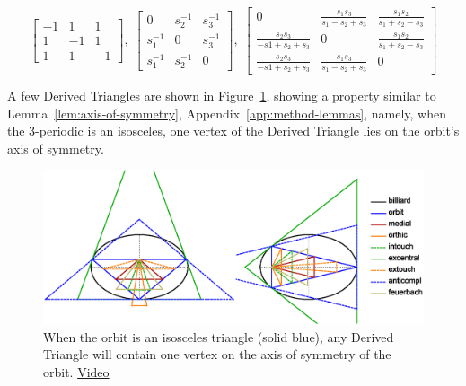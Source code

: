 

\begin{equation*}
\left[
\begin{matrix}
-1&1&1\\1&-1&1\\1&1&-1
\end{matrix}
\right],\;
\left[
\begin{matrix}
0&s_2^{-1}&s_3^{-1}\\s_1^{-1}&0&s_3^{-1}\\s_1^{-1}&s_2^{-1}&0
\end{matrix}
\right],\;
\left[
\begin{matrix}
0&\frac{s_1 s_3}{s_1-s_2+s_3}&\frac{s_1 s_2}{s_1+s_2-s_3}\\
\frac{s_2 s_3}{-s1+s_2+s_3}&0&\frac{s_1 s_2}{s_1+s_2-s_3}\\
\frac{s_2 s_3}{-s1+s_2+s_3}&\frac{s_1 s_3}{s_1-s_2+s_3}&0
\end{matrix}
\right]
\end{equation*}

A few Derived Triangles are shown in Figure~\ref{fig:derived-isosceles}, showing a property similar to Lemma~\ref{lem:axis-of-symmetry}, Appendix~\ref{app:method-lemmas}, namely, when the 3-periodic is an isosceles, one vertex of the Derived Triangle lies on the orbit's axis of symmetry.

\begin{figure}[H]
    \centering
    \includegraphics[width=\textwidth]{pics_1070_lemma3}
    \caption{When the orbit is an isosceles triangle (solid blue), any Derived Triangle will contain one vertex on the axis of symmetry of the orbit. \href{https://youtu.be/xyroRTEVNDc}{Video}}
    \label{fig:derived-isosceles}
\end{figure}



